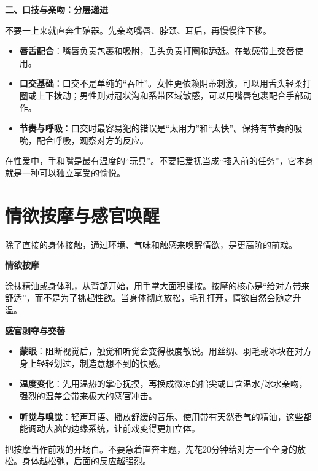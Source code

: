 \documentclass[12pt,UTF8]{ctexbook}
\begin{document}
\textbf{二、口技与亲吻：分层递进}

不要一上来就直奔生殖器。先亲吻嘴唇、脖颈、耳后，再慢慢往下移。

\begin{itemize}
\item \textbf{唇舌配合}：嘴唇负责包裹和吸附，舌头负责打圈和舔舐。在敏感带上交替使用。
\item \textbf{口交基础}：口交不是单纯的“吞吐”。女性更依赖阴蒂刺激，可以用舌头轻柔打圈或上下拨动；男性则对冠状沟和系带区域敏感，可以用嘴唇包裹配合手部动作。
\item \textbf{节奏与呼吸}：口交时最容易犯的错误是“太用力”和“太快”。保持有节奏的吸吮，配合呼吸，观察对方的反应。
\end{itemize}

\begin{tcolorbox}[colback=pink!5!white,colframe=red!50!black,title=贴心小叮咛]
在性爱中，手和嘴是最有温度的“玩具”。不要把爱抚当成“插入前的任务”，它本身就是一种可以独立享受的愉悦。
\end{tcolorbox}

\section{情欲按摩与感官唤醒}

除了直接的身体接触，通过环境、气味和触感来唤醒情欲，是更高阶的前戏。

\textbf{情欲按摩}

涂抹精油或身体乳，从背部开始，用手掌大面积揉按。按摩的核心是“给对方带来舒适”，而不是为了挑起性欲。当身体彻底放松，毛孔打开，情欲自然会随之升温。

\textbf{感官剥夺与交替}

\begin{itemize}
\item \textbf{蒙眼}：阻断视觉后，触觉和听觉会变得极度敏锐。用丝绸、羽毛或冰块在对方身上轻轻划过，制造意想不到的快感。
\item \textbf{温度变化}：先用温热的掌心抚摸，再换成微凉的指尖或口含温水/冰水亲吻，强烈的温差会带来极大的感官冲击。
\item \textbf{听觉与嗅觉}：轻声耳语、播放舒缓的音乐、使用带有天然香气的精油，这些都能调动大脑的边缘系统，让前戏变得更加立体。
\end{itemize}

\begin{tcolorbox}[colback=pink!5!white,colframe=red!50!black,title=贴心小叮咛]
把按摩当作前戏的开场白。不要急着直奔主题，先花20分钟给对方一个全身的放松。身体越松弛，后面的反应越强烈。
\end{tcolorbox}
\end{document}
